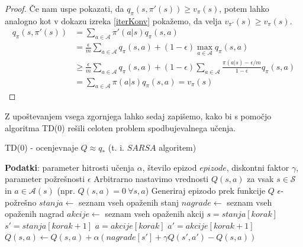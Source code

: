 \documentclass[12pt,a4paper]{amsart}
\theoremstyle{definition} %
\theoremstyle{plain} %
\begin{document}
\begin{proof}
    Če nam uspe pokazati, da $q_\pi(s, \pi'(s)) \geq v_\pi(s)$, potem lahko analogno kot v dokazu izreka 
    \ref{iterKonv} pokažemo, da velja $v_{\pi'}(s) \geq v_\pi(s)$.
    \begin{align*}
        q_\pi(s, \pi'(s)) &= \sum_{a \in \mathcal{A}} \pi'(a|s) q_\pi(s, a) \\
        &= \frac{\epsilon}{m} \sum_{a \in \mathcal{A}} q_\pi(s, a) + (1 - \epsilon) \max_{a \in 
            \mathcal{A}} q_\pi(s, a) \\
        &\geq \frac{\epsilon}{m} \sum_{a \in \mathcal{A}} q_\pi(s, a) + (1 - \epsilon) \sum_{a \in \mathcal{A}} 
            \frac{\pi(a|s) - \epsilon / m}{1 - \epsilon} q_\pi(s, a) \\
        &= \sum_{a \in \mathcal{A}} \pi(a|s) q_\pi(s, a) = v_\pi(s)
    \end{align*}
\end{proof}

Z upoštevanjem vsega zgornjega lahko sedaj zapišemo, kako bi s pomočjo algoritma TD($0$) rešili 
celoten problem spodbujevalnega učenja.

\begin{algorithm}[H]
    \caption{TD($0$) - ocenjevnaje  $Q \approx q_*$ (t. i. $SARSA$ algoritem)}
\begin{algorithmic}\label{SARSA}
    
    \STATE \textbf{Podatki}: parameter hitrosti učenja $\alpha$, število epizod $epizode$, diskontni 
            faktor $\gamma$, parameter požrešnosti $\epsilon$
    \STATE 
    \STATE Arbitrarno nastavimo vrednosti $Q(s, a)$ za vsak $s \in \mathcal{S}$ in $a \in \mathcal{A}(s)$ 
            (npr. $Q(s, a) = 0~\forall s, a$)
    \STATE
        \STATE Generiraj epizodo prek funkcije $Q$ $\epsilon$-požrešno
        \STATE $stanja \leftarrow$ seznam vseh opaženih stanj
        \STATE $nagrade \leftarrow$ seznam vseh opaženih nagrad
        \STATE $akcije \leftarrow$ seznam vseh opaženih akcij
        \STATE
        \STATE $s = stanja[korak]$
        \STATE $s' = stanja[korak + 1]$
        \STATE $a = akcije[korak]$
        \STATE $a' = akcije[korak + 1]$
        \STATE $Q(s, a) \leftarrow Q(s, a) + \alpha (nagrade[s'] + \gamma Q(s', a') - Q(s, a))$ 
        \ENDFOR
    \ENDFOR

\end{algorithmic}
\end{algorithm}
\end{document}
